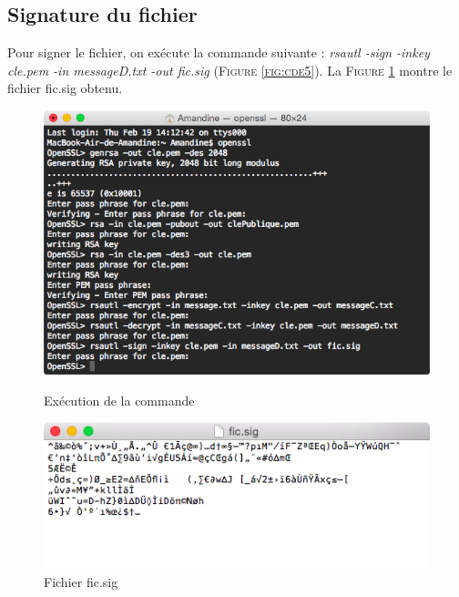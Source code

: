 \documentclass[11pt]{article}
\begin{document}
\subsection{Signature du fichier}
Pour signer le fichier, on exécute la commande suivante : \textit{rsautl -sign -inkey cle.pem -in messageD.txt -out fic.sig} (\textsc{Figure \ref{fig:cde5}}). La  \textsc{Figure \ref{fig:signature}} montre le fichier fic.sig obtenu.
\begin{figure}[hbtp]
    \begin{minipage}[b]{0.4\linewidth}
        \centering \includegraphics[scale=0.4]{Capture/question6.png}
        \caption{Exécution de la commande}
                \label{fig:cde5}
\label{fig:base}
    \end{minipage}\hfill
    \begin{minipage}[b]{0.48\linewidth}
        \centering \includegraphics[scale=0.4]{Capture/question6b.png}
        \caption{Fichier fic.sig}
         \label{fig:signature}
    \end{minipage}
\end{figure}
\end{document}

